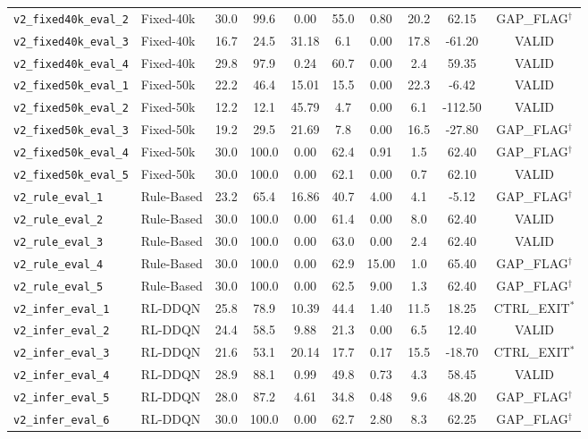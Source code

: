 \documentclass[12pt,a4paper,oneside]{report}
\begin{document}
\begin{longtable}{llcccccccc}
\texttt{v2\_fixed40k\_eval\_2} & Fixed-40k & 30.0 & 99.6 & 0.00 & 55.0 & 0.80 & 20.2 & 62.15 & GAP\_FLAG$^\dagger$ \\
\texttt{v2\_fixed40k\_eval\_3} & Fixed-40k & 16.7 & 24.5 & 31.18 & 6.1 & 0.00 & 17.8 & -61.20 & VALID \\
\texttt{v2\_fixed40k\_eval\_4} & Fixed-40k & 29.8 & 97.9 & 0.24 & 60.7 & 0.00 & 2.4 & 59.35 & VALID \\
\midrule
\texttt{v2\_fixed50k\_eval\_1} & Fixed-50k & 22.2 & 46.4 & 15.01 & 15.5 & 0.00 & 22.3 & -6.42 & VALID \\
\texttt{v2\_fixed50k\_eval\_2} & Fixed-50k & 12.2 & 12.1 & 45.79 & 4.7 & 0.00 & 6.1 & -112.50 & VALID \\
\texttt{v2\_fixed50k\_eval\_3} & Fixed-50k & 19.2 & 29.5 & 21.69 & 7.8 & 0.00 & 16.5 & -27.80 & GAP\_FLAG$^\dagger$ \\
\texttt{v2\_fixed50k\_eval\_4} & Fixed-50k & 30.0 & 100.0 & 0.00 & 62.4 & 0.91 & 1.5 & 62.40 & GAP\_FLAG$^\dagger$ \\
\texttt{v2\_fixed50k\_eval\_5} & Fixed-50k & 30.0 & 100.0 & 0.00 & 62.1 & 0.00 & 0.7 & 62.10 & VALID \\
\midrule
\texttt{v2\_rule\_eval\_1} & Rule-Based & 23.2 & 65.4 & 16.86 & 40.7 & 4.00 & 4.1 & -5.12 & GAP\_FLAG$^\dagger$ \\
\texttt{v2\_rule\_eval\_2} & Rule-Based & 30.0 & 100.0 & 0.00 & 61.4 & 0.00 & 8.0 & 62.40 & VALID \\
\texttt{v2\_rule\_eval\_3} & Rule-Based & 30.0 & 100.0 & 0.00 & 63.0 & 0.00 & 2.4 & 62.40 & VALID \\
\texttt{v2\_rule\_eval\_4} & Rule-Based & 30.0 & 100.0 & 0.00 & 62.9 & 15.00 & 1.0 & 65.40 & GAP\_FLAG$^\dagger$ \\
\texttt{v2\_rule\_eval\_5} & Rule-Based & 30.0 & 100.0 & 0.00 & 62.5 & 9.00 & 1.3 & 62.40 & GAP\_FLAG$^\dagger$ \\
\midrule
\texttt{v2\_infer\_eval\_1} & RL-DDQN & 25.8 & 78.9 & 10.39 & 44.4 & 1.40 & 11.5 & 18.25 & CTRL\_EXIT$^*$ \\
\texttt{v2\_infer\_eval\_2} & RL-DDQN & 24.4 & 58.5 & 9.88 & 21.3 & 0.00 & 6.5 & 12.40 & VALID \\
\texttt{v2\_infer\_eval\_3} & RL-DDQN & 21.6 & 53.1 & 20.14 & 17.7 & 0.17 & 15.5 & -18.70 & CTRL\_EXIT$^*$ \\
\texttt{v2\_infer\_eval\_4} & RL-DDQN & 28.9 & 88.1 & 0.99 & 49.8 & 0.73 & 4.3 & 58.45 & VALID \\
\texttt{v2\_infer\_eval\_5} & RL-DDQN & 28.0 & 87.2 & 4.61 & 34.8 & 0.48 & 9.6 & 48.20 & GAP\_FLAG$^\dagger$ \\
\texttt{v2\_infer\_eval\_6} & RL-DDQN & 30.0 & 100.0 & 0.00 & 62.7 & 2.80 & 8.3 & 62.25 & GAP\_FLAG$^\dagger$ \\
\bottomrule
\end{longtable}
\end{document}

